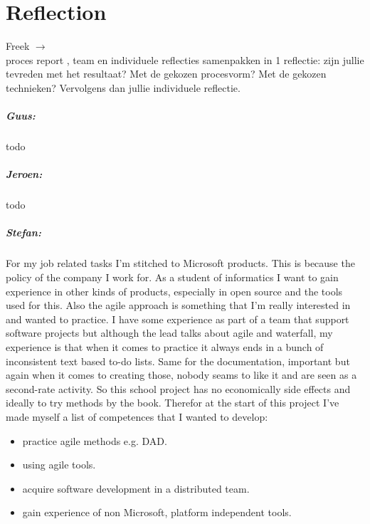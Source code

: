 \chapter{Reflection}
\begin{tcolorbox}[colback=yellow!30]
Freek $\rightarrow$ \\ 
proces report , team en individuele reflecties samenpakken in 1 reflectie: zijn jullie tevreden met het resultaat? Met de gekozen procesvorm? Met de gekozen technieken? Vervolgens dan jullie individuele reflectie.
\end{tcolorbox}


\paragraph{Guus: }
todo \\


\paragraph{Jeroen: }
todo \\ 



\paragraph{Stefan: }
For my job related tasks I'm stitched to Microsoft products. This is because the
policy of the company I work for. As a student of informatics I want to gain
experience in other kinds of products, especially in open source and the tools
used for this. Also the agile approach is something that I'm really interested
in and wanted to practice. I have some experience as part of a team that support
software projects but although the lead talks about agile and waterfall, my
experience is that when it comes to practice it always ends in a bunch of
inconsistent text based to-do lists. Same for the documentation, important but
again when it comes to creating those, nobody seams to like it and are seen as a
second-rate activity. So this school project has no economically side effects
and ideally to try methods by the book. Therefor at the start of this project
I've made myself a list of competences that I wanted to develop:
\begin{itemize}
 \item practice agile methods e.g. DAD.
 \item using agile tools.
 \item acquire software development in a distributed team.
 \item gain experience of non Microsoft, platform independent tools.
\end{itemize}

